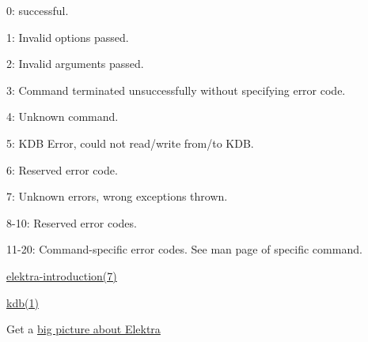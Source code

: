\begin{DoxyItemize}
\item 0\+: successful.
\item 1\+: Invalid options passed.
\item 2\+: Invalid arguments passed.
\item 3\+: Command terminated unsuccessfully without specifying error code.
\item 4\+: Unknown command.
\item 5\+: K\+DB Error, could not read/write from/to K\+DB.
\item 6\+: Reserved error code.
\item 7\+: Unknown errors, wrong exceptions thrown.
\item 8-\/10\+: Reserved error codes.
\item 11-\/20\+: Command-\/specific error codes. See man page of specific command.
\end{DoxyItemize}


\begin{DoxyItemize}
\item \hyperlink{doc_help_elektra-introduction_md}{elektra-\/introduction(7)}
\item \hyperlink{doc_help_kdb_md}{kdb(1)}
\item Get a \hyperlink{doc_BIGPICTURE_md}{big picture about Elektra} 
\end{DoxyItemize}